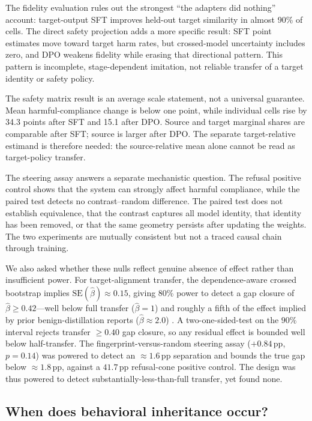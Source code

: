 \documentclass[letterpaper]{article}
\begin{document}
The fidelity evaluation rules out the strongest ``the adapters did nothing'' account:
target-output SFT improves held-out target similarity in almost 90\% of cells. The direct
safety projection adds a more specific result: SFT point estimates move toward target harm
rates, but crossed-model uncertainty includes zero, and DPO weakens fidelity while erasing
that directional pattern. This pattern is incomplete, stage-dependent imitation, not reliable
transfer of a target identity or safety policy.

The safety matrix result is an average scale statement, not a universal guarantee. Mean
harmful-compliance change is below one point, while individual cells rise by 34.3
points after SFT and 15.1 after DPO. Source and target marginal shares are comparable
after SFT; source is larger after DPO. The separate target-relative estimand is therefore
needed: the source-relative mean alone cannot be read as target-policy transfer.

The steering assay answers a separate mechanistic question. The refusal positive
control shows that the system can strongly affect harmful compliance, while the paired
test detects no contrast--random difference. The paired test does not establish equivalence, that
the contrast captures all model identity, that identity has been removed, or that the
same geometry persists after updating the weights. The two experiments are mutually
consistent but not a traced causal chain through training.

We also asked whether these nulls reflect genuine absence of effect rather than
insufficient power. For target-alignment transfer, the dependence-aware crossed bootstrap
implies $\mathrm{SE}(\hat\beta)\approx0.15$, giving 80\% power \citep{cohen1988power} to
detect a gap closure of $\hat\beta\ge0.42$---well below full transfer ($\hat\beta=1$) and
roughly a fifth of the effect implied by prior benign-distillation reports
($\hat\beta\approx2.0$) \citep{jahan2025medical}. A two-one-sided-test
\citep{schuirmann1987tost,lakens2017equivalence} on the $90\%$ interval rejects transfer
$\ge0.40$ gap closure, so any residual effect is bounded well below half-transfer. The
fingerprint-versus-random steering assay ($+0.84$\,pp, $p=0.14$) was powered to detect an
$\approx1.6$\,pp separation and bounds the true gap below $\approx1.8$\,pp, against a
$41.7$\,pp refusal-cone positive control. The design was thus powered to detect
substantially-less-than-full transfer, yet found none.

\subsection{When does behavioral inheritance occur?}
\label{subsec:inheritance-boundary}
\end{document}
